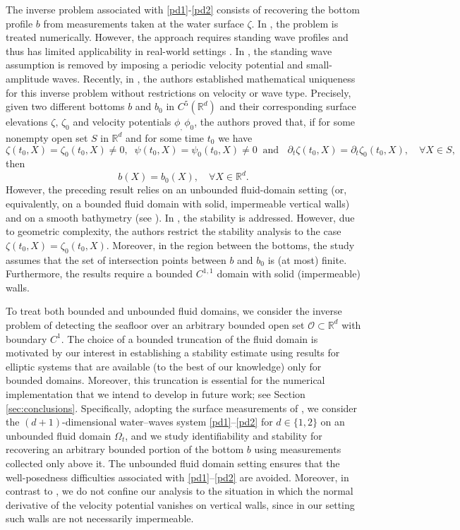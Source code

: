 \documentclass[11pt]{article}
\begin{document}
The inverse problem associated with \eqref{pd1}-\eqref{pd2} consists of recovering the bottom profile $b$ from measurements taken at the water surface $\zeta$. In \cite{nicholls2008joint}, the problem is treated numerically. However, the approach requires standing wave profiles and thus has limited applicability in real-world settings \cite{nicholls2009detection}. In \cite{vasan2013inverse}, the standing wave assumption is removed by imposing a periodic velocity potential and small-amplitude waves. Recently, in \cite{fontelos2017bottom}, the authors established mathematical uniqueness for this inverse problem without restrictions on velocity or wave type. Precisely, given two different bottoms $b$ and $b_0$ in $ C^5(\mathbb{R}^d)$  and their corresponding surface elevations  $\zeta,\, \zeta_0$ and velocity potentials  $\phi_,\, \phi_0$, the authors proved that, if for some nonempty open set $S$ in $\mathbb{R}^d$ and for some  time $t_0$ we have  $$\zeta(t_0,X)=\zeta_0(t_0,X)\neq 0,\;\; \psi(t_0,X)=\psi_0(t_0,X)\neq 0\;\;\text{and }\;\; \partial_t\zeta(t_0,X)=\partial_t\zeta_0(t_0,X),\quad \forall X\in S,$$
then 
$$b(X)=b_0(X),\quad \forall X\in \mathbb{R}^d.$$
However, the preceding result relies on an unbounded fluid-domain setting (or, equivalently, on a bounded fluid domain with solid, impermeable vertical walls) and on a smooth bathymetry (see \cite[Section 2.2]{fontelos2017bottom}). In \cite{lecaros2020stability}, the stability is addressed. However, due to geometric complexity, the authors restrict the stability analysis to the case $\zeta(t_0,X) = \zeta_0(t_0,X)$. Moreover, in the region between the bottoms, the study assumes that the set of intersection points between $b$ and $b_0$ is (at most) finite. Furthermore, the results require a bounded $C^{1,1}$ domain with solid (impermeable) walls.


To treat both bounded and unbounded fluid domains, we consider the inverse problem of detecting the seafloor over an arbitrary bounded open set $\mathcal O \subset \mathbb{R}^d$ with boundary $C^1$. The choice of a bounded truncation of the fluid domain is motivated by our interest in establishing a stability estimate using results for elliptic systems that are available (to the best of our knowledge) only for bounded domains. Moreover, this truncation is essential for the numerical implementation that we intend to develop in future work; see Section \ref{sec:conclusions}. Specifically, adopting the surface measurements of \cite{fontelos2017bottom, lecaros2020stability}, we consider the $(d+1)$-dimensional water–waves system \eqref{pd1}–\eqref{pd2} for $d\in\{1,2\}$ on an unbounded fluid domain $\Omega_t$, and we study identifiability and stability for recovering an arbitrary bounded portion of the bottom $b$ using measurements collected only above it. The unbounded fluid domain setting ensures that the well-posedness difficulties associated with \eqref{pd1}–\eqref{pd2} \cite{benjamin1979gravity} are avoided. 
Moreover, in contrast to \cite{lecaros2020stability}, we do not confine our analysis to the situation in which the normal derivative of the velocity potential vanishes on vertical walls, since in our setting such walls are not necessarily impermeable.
\end{document}
